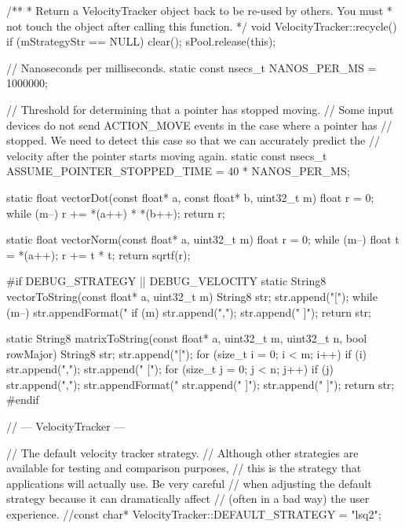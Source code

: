 /**
 * Return a VelocityTracker object back to be re-used by others.  You must
 * not touch the object after calling this function.
 */
void VelocityTracker::recycle() {
    if (mStrategyStr == NULL) {
        clear();
        sPool.release(this);
    }
}

// Nanoseconds per milliseconds.
static const nsecs_t NANOS_PER_MS = 1000000;

// Threshold for determining that a pointer has stopped moving.
// Some input devices do not send ACTION_MOVE events in the case where a pointer has
// stopped.  We need to detect this case so that we can accurately predict the
// velocity after the pointer starts moving again.
static const nsecs_t ASSUME_POINTER_STOPPED_TIME = 40 * NANOS_PER_MS;

static float vectorDot(const float* a, const float* b, uint32_t m) {
    float r = 0;
    while (m--) {
        r += *(a++) * *(b++);
    }
    return r;
}

static float vectorNorm(const float* a, uint32_t m) {
    float r = 0;
    while (m--) {
        float t = *(a++);
        r += t * t;
    }
    return sqrtf(r);
}

#if DEBUG_STRATEGY || DEBUG_VELOCITY
static String8 vectorToString(const float* a, uint32_t m) {
    String8 str;
    str.append("[");
    while (m--) {
        str.appendFormat(" %
        if (m) {
            str.append(",");
        }
    }
    str.append(" ]");
    return str;
}

static String8 matrixToString(const float* a, uint32_t m, uint32_t n, bool rowMajor) {
    String8 str;
    str.append("[");
    for (size_t i = 0; i < m; i++) {
        if (i) {
            str.append(",");
        }
        str.append(" [");
        for (size_t j = 0; j < n; j++) {
            if (j) {
                str.append(",");
            }
            str.appendFormat(" %
        }
        str.append(" ]");
    }
    str.append(" ]");
    return str;
}
#endif

// --- VelocityTracker ---

// The default velocity tracker strategy.
// Although other strategies are available for testing and comparison purposes,
// this is the strategy that applications will actually use.  Be very careful
// when adjusting the default strategy because it can dramatically affect
// (often in a bad way) the user experience.
//const char* VelocityTracker::DEFAULT_STRATEGY = "lsq2";

